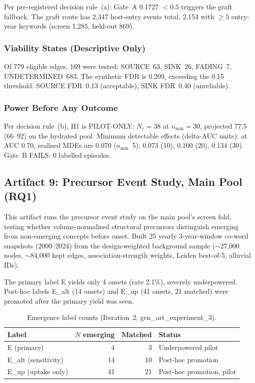 \documentclass[11pt,letterpaper]{article}
\begin{document}
Per pre-registered decision rule~(a): Gate~A 0.1727 $< 0.5$ triggers the graft fallback. The graft route has 2,347 host-entry events total, 2,154 with $\geq 5$ entry-year keywords (screen 1,285, held-out 869).

\subsubsection{Viability States (Descriptive Only)}

Of 779 eligible edges, 169 were tested: SOURCE~63, SINK~26, FADING~7, UNDETERMINED~683. The synthetic FDR is 0.209, exceeding the 0.15 threshold. SOURCE FDR~0.13 (acceptable), SINK FDR~0.40 (unreliable).

\subsubsection{Power Before Any Outcome}

Per decision rule~(b), H1 is PILOT-ONLY: $N_c = 38$ at $n_{\min} = 30$, projected 77.5 (66--92) on the hydrated pool. Minimum detectable effects (delta-AUC units): at AUC 0.70, realised MDEs are 0.070 ($n_{\min}$~5), 0.073 (10), 0.100 (20), 0.134 (30). Gate~B FAILS: 0 labelled episodes.

\subsection{Artifact 9: Precursor Event Study, Main Pool (RQ1)}

This artifact runs the precursor event study on the main pool's screen fold, testing whether volume-normalised structural precursors distinguish emerging from non-emerging concepts before onset.
Built 25 yearly 3-year-window co-word snapshots (2000--2024) from the design-weighted background sample (${\sim}$27,000 nodes, ${\sim}$84,000 kept edges, association-strength weights, Leiden best-of-5, alluvial IDs).

The primary label E yields only 4 onsets (rate 2.1\%), severely underpowered. Post-hoc labels E\_alt (14 onsets) and E\_up (41 onsets, 21 matched) were promoted after the primary yield was seen.

\begin{table}[!htbp]
\centering
\caption{Emergence label counts (Iteration~2, gen\_art\_experiment\_3).}
\label{tab:emergence_labels}
\begin{tabular}{L{4cm}rrL{4cm}}
\toprule
Label & $N$ emerging & Matched & Status \\
\midrule
E (primary) & 4 & 3 & Underpowered pilot \\
E\_alt (sensitivity) & 14 & 10 & Post-hoc promotion \\
E\_up (uptake only) & 41 & 21 & Post-hoc promotion, pilot \\
\bottomrule
\end{tabular}
\end{table}
\end{document}
